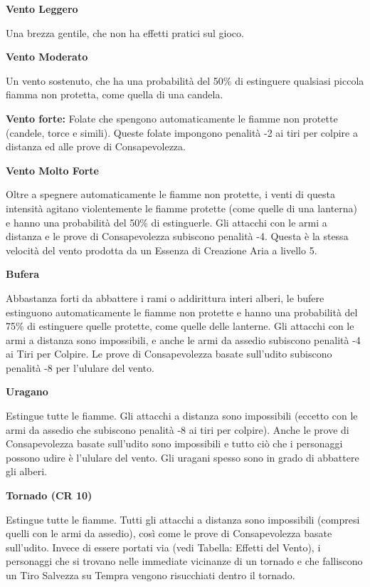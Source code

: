 \documentclass[a4paper,11pt,twoside,openany]{book}
\begin{document}
\bigskip

\textbf{Vento Leggero}

Una brezza gentile, che non ha effetti pratici sul gioco.

\textbf{Vento Moderato}

Un vento sostenuto, che ha una probabilità del 50\% di estinguere qualsiasi piccola fiamma non protetta, come quella di una candela.

\textbf{Vento forte:} Folate che spengono automaticamente le fiamme non protette (candele, torce e simili). Queste folate impongono penalità -2 ai tiri per colpire a distanza ed alle prove di Consapevolezza.

\textbf{Vento Molto Forte}

Oltre a spegnere automaticamente le fiamme non protette, i venti di questa intensità agitano violentemente le fiamme protette (come quelle di una lanterna) e hanno una probabilità del 50\% di estinguerle. Gli attacchi con le armi a distanza e le prove di Consapevolezza subiscono penalità -4. Questa è la stessa velocità del vento prodotta da un Essenza di Creazione Aria a livello 5.

\textbf{Bufera}

Abbastanza forti da abbattere i rami o addirittura interi alberi, le bufere estinguono automaticamente le fiamme non protette e hanno una probabilità del 75\% di estinguere quelle protette, come quelle delle lanterne. Gli attacchi con le armi a distanza sono impossibili, e anche le armi da assedio subiscono penalità -4 ai Tiri per Colpire. Le prove di Consapevolezza basate sull'udito subiscono penalità -8 per l'ululare del vento.

\textbf{Uragano}

Estingue tutte le fiamme. Gli attacchi a distanza sono impossibili (eccetto con le armi da assedio che subiscono penalità -8 ai tiri per colpire). Anche le prove di Consapevolezza basate sull'udito sono impossibili e tutto ciò che i personaggi possono udire è l'ululare del vento. Gli uragani spesso sono in grado di abbattere gli alberi.

\textbf{Tornado (CR 10)}

Estingue tutte le fiamme. Tutti gli attacchi a distanza sono impossibili (compresi quelli con le armi da assedio), così come le prove di Consapevolezza basate sull'udito. Invece di essere portati via (vedi Tabella: Effetti del Vento), i personaggi che si trovano nelle immediate vicinanze di un tornado e che falliscono un Tiro Salvezza su Tempra vengono risucchiati dentro il tornado.
\end{document}
